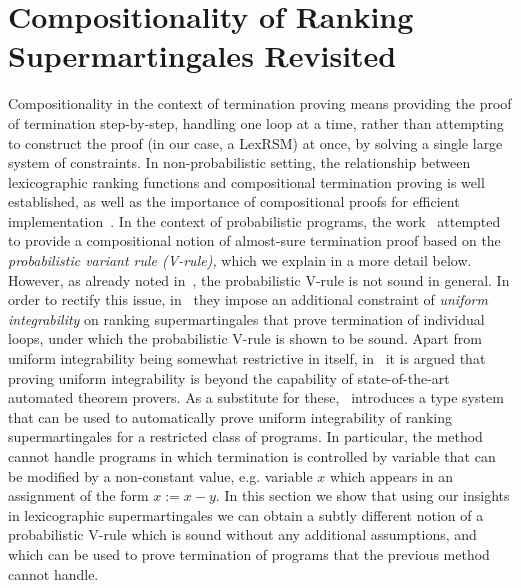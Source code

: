 \section{Compositionality of Ranking Supermartingales Revisited}
\label{sec:compositional}

Compositionality in the context of termination proving means providing the 
proof of termination step-by-step, handling one loop at a time, rather than 
attempting to construct the proof (in our case, a LexRSM) at once, by solving a 
single large system of constraints. In non-probabilistic setting, the 
relationship between lexicographic ranking functions and compositional 
termination proving is well established, as well as the importance of 
compositional proofs for efficient implementation~\cite{xxx}. In the context of 
probabilistic programs, the work~\cite{HolgerPOPL} attempted to provide a 
compositional notion of almost-sure termination proof based on the 
\emph{probabilistic variant rule (V-rule),} which we explain in a more detail 
below. 
However, as already noted in~\cite{HolgerPOPL}, the probabilistic V-rule is not 
sound in general. In order to rectify this issue, in~\cite{HolgerPOPL} they 
impose an additional constraint of \emph{uniform integrability} on ranking 
supermartingales that prove termination of individual loops, 
under which the probabilistic V-rule is shown to be sound. Apart from uniform 
integrability being somewhat restrictive in itself, in~\cite{HolgerPOPL} it is 
argued that proving uniform integrability is beyond the capability of 
state-of-the-art automated theorem provers. As a substitute for 
these,~\cite{HolgerPOPL} introduces a type system that can be used to 
automatically prove 
uniform integrability of ranking supermartingales for a restricted class of 
programs. In particular, the method cannot handle programs in which termination 
is controlled by variable that can be modified by a non-constant value, e.g. 
variable $x$ which appears in an assignment of the form $x:=x-y$. In this 
section we show that using our insights in lexicographic supermartingales we 
can obtain a subtly different notion of a probabilistic V-rule which is sound 
without any additional assumptions, and which can be used to prove termination 
of programs that the previous method cannot handle. 


